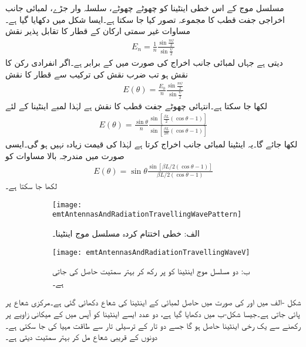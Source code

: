 مسلسل موج کے اس خطی اینٹینا کو چھوٹے چھوٹے، سلسلہ وار جڑے، لمبائی جانب اخراجی جفت قطب کا مجموعہ تصور کیا جا سکتا ہے۔ایسا شکل میں دکھایا گیا ہے۔مساوات  غیر سمتی ارکان کے قطار کا تقابل پذیر نقش 
\begin{align*}
E_n=\frac{1}{n}\frac{\sin \frac{n\psi}{2}}{\sin \frac{\psi}{2}}
\end{align*}
دیتی ہے جہاں لمبائی جانب اخراج کی صورت میں   کے برابر ہے۔اگر انفرادی رکن کا نقش  ہو تب  ضرب نقش کی ترکیب سے قطار کا نقش
\begin{align*}
E(\theta)=\frac{E_0}{n}\frac{\sin \frac{n\psi}{2}}{\sin \frac{\psi}{2}}
\end{align*}
لکھا جا سکتا ہے۔انتہائی چھوٹے جفت قطب کا نقش  ہے لہٰذا لمبے اینٹینا  کے لئے
\begin{align}
E(\theta)=\frac{\sin \theta}{n} \frac{\sin[\frac{\beta L}{2} (\cos \theta-1)]}{\sin [\frac{\beta L}{2n} (\cos \theta-1)]}
\end{align}
لکھا جائے گا۔یہ اینٹینا لمبائی جانب اخراج کرتا ہے لہٰذا  کی قیمت زیادہ نہیں ہو گی۔ایسی صورت میں مندرجہ بالا مساوات کو
\begin{align}\label{مساوات_اینٹینا_لمبی_مسلسل_موج_اینٹینا}
E(\theta)=\sin \theta\frac{\sin[\beta L\!/\!2 (\cos \theta-1)]}{\beta L\!/\!2 (\cos \theta-1)}
\end{align}
لکھا جا سکتا ہے۔

\begin{figure}
\centering
\begin{subfigure}{0.5\textwidth}
\centering
\texttt{[image: emtAntennasAndRadiationTravellingWavePattern]}
\caption*{الف: خطی اختتام کردہ مسلسل موج اینٹینا۔}
\end{subfigure}%
\begin{subfigure}{0.5\textwidth}
\centering
\texttt{[image: emtAntennasAndRadiationTravellingWaveV]}
\caption{ب: دو مسلسل موج اینٹینا کو  پر رکھ کر بہتر سمتیت حاصل کی جاتی ہے۔}
\end{subfigure}%
\caption{}
\label{شکل_اینٹینا_مسلسل_موج_شعاع}
\end{figure}

شکل -الف میں اور  کی صورت میں حاصل  لمبائی کے اینٹینا کی شعاع دکھائی گئی ہے۔مرکزی شعاع  پر پائی جاتی ہے۔جیسا شکل-ب میں دکھایا گیا ہے، دو عدد ایسے اینٹینا کو آپس میں  کے میکانی زاویے پر رکھنے سے یک رخی اینٹینا حاصل ہو گا جسے  دو تار کے ترسیلی تار سے طاقت مہیا کی جا سکتی ہے۔دونوں کے قریبی شعاع مل کر بہتر سمتیت دیتی ہے۔

